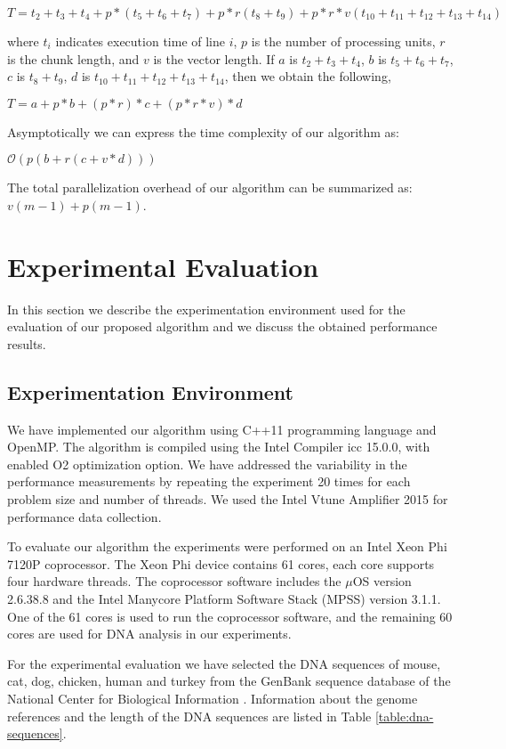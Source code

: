 \documentclass[conference]{IEEEtran}
\begin{document}
$T = t_2 + t_3 + t_4 + p*(t_5 + t_6 + t_7) + p*r(t_8 + t_9) + p*r*v(t_10 + t_11 + t_12 + t_13 + t_14)$


where $t_i$ indicates execution time of line $i$, $p$ is the number of processing units, $r$ is the chunk length, and $v$ is the vector length. If $a$ is $t_2 + t_3 + t_4$, $b$ is $t_5 + t_6 + t_7$, $c$ is $t_8 + t_9$, $d$ is $t_10 + t_11 + t_12 + t_13 + t_14$, then we obtain the following,

$T = a + p*b + (p*r)*c + (p*r*v)*d$

Asymptotically we can express the time complexity of our algorithm as:

$\mathcal{O}(p (b + r(c + v * d)))$

The total parallelization overhead of our algorithm can be summarized as: $v(m-1) + p(m-1)$.





\section{Experimental Evaluation} 
\label{exp_evaluation}

In this section we describe the experimentation environment used for the evaluation of our proposed algorithm and we discuss the obtained performance results.


\subsection{Experimentation Environment}

We have implemented our algorithm using C++11 programming language and OpenMP. The algorithm is compiled using the Intel Compiler icc 15.0.0, with enabled O2 optimization option. We have addressed the variability in the performance measurements by repeating the experiment 20 times for each problem size and number of threads. We used the Intel Vtune Amplifier 2015 for performance data collection. 

To evaluate our algorithm the experiments were performed on an Intel Xeon Phi 7120P coprocessor. The Xeon Phi device contains 61 cores, each core supports four hardware threads. The coprocessor software includes the $\mu$OS version 2.6.38.8 and the Intel Manycore Platform Software Stack (MPSS) version 3.1.1. One of the 61 cores is used to run the coprocessor software, and the remaining 60 cores are used for DNA analysis in our experiments. 

For the experimental evaluation we have selected the DNA sequences of mouse, cat, dog, chicken, human and turkey from the GenBank sequence database of the National Center for Biological Information \cite{GenBank}. Information about the genome references and the length of the DNA sequences are listed in Table \ref{table:dna-sequences}.
\end{document}

